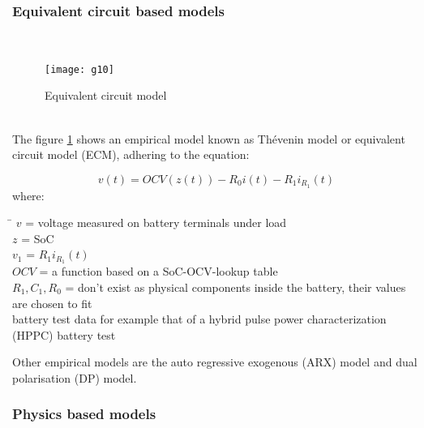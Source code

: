 \subsubsection{Equivalent circuit based models}
\label{section:Equivalentcircuitbasedmodels}
\
\
\
\begin{figure}[h!]
\begin{center}



\texttt{[image: g10]} %
\caption{\label{fig:ECMThevinModel} Equivalent circuit model }
\end{center} 
\end{figure} 
 \\
The figure \ref{fig:ECMThevinModel} shows an empirical model known as Thévenin model or equivalent circuit model (ECM), adhering to the equation: 

\begin{equation}
{v}(t) = {OCV}(z(t))  - {R}_{0} i(t) - {R}_{1} {i}_{R_1}(t) 
\label{equation:ECM}
\end{equation}
where: 
\begin{tabbing}
\phantom{$v(t)  \  \ \ \ \ \ \ \ \ \ \ \ $}\= \kill
$v$\> =  voltage measured on battery terminals under load   \\
$z  $\> =  SoC  \\
$v_	1$\> =  ${R}_{1} {i}_{R_1}(t)$ \\
$OCV $\>  = a function based on a SoC-OCV-lookup table \\
$R_1,C_1,R_0$\> = don't exist as physical components inside the battery, their values are chosen to fit  \\
battery test data for example that of a hybrid pulse power characterization (HPPC) battery test  \\ %

\end{tabbing}

Other empirical models are the auto regressive exogenous (ARX) model and dual polarisation (DP) model. %

\subsubsection{Physics based models}
\label{section:Physics based models}

